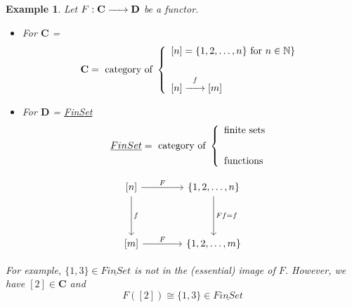 \documentclass{article}
\newtheorem{example}{Example}[section]
\renewcommand{\to}{\xrightarrow{\hspace{0.5cm}}}  %
\begin{document}
    \begin{example}
        Let \(F: \mathbf{C} \to \mathbf{D}\) be a functor.

        \newline

        \begin{itemize}
            \item For \(\mathbf{C}\) =
            \[
                \mathbf{C} = \text{ category of }
                \left\{
                \begin{array}{ll}
                [n]
                    = \{1, 2, \dots, n\} \text{ for } n \in \mathbb{N} \} \\
                    \vspace{0.1in}                                        \\
                    \text{$[n]$} \stackrel{f}{\to} \text{$[m]$}           \\
                \end{array}
                \right.
            \]
            \item For \(\mathbf{D}\) = \underline{FinSet}
            \[
                \underline{FinSet} = \text{ category of }
                \left\{
                \begin{array}{ll}
                    \text{finite sets} \\
                    \vspace{0.1in}     \\
                    \text{functions}   \\
                \end{array}
                \right.
            \]
        \end{itemize}

        \[
            \begin{tikzcd}[column sep=4em, row sep=4em]
            [n]
                \arrow[r, "F"] \arrow[d, "f"]
                & \{1, 2, \dots, n\} \arrow[d, "Ff=f"] \\
                \text{$[m]$} \arrow[r, "F"]
                & \{1, 2, \dots, m\}
            \end{tikzcd}
        \]

        For example, \(\{1, 3\} \in \underline{FinSet}\)  is not in the (essential) image of \(F\).
        However, we have \([2] \in \mathbf{C}\) and
        \[
            F([2]) \cong \{1, 3\} \in \underline{FinSet}
        \]
    \end{example}
\end{document}
